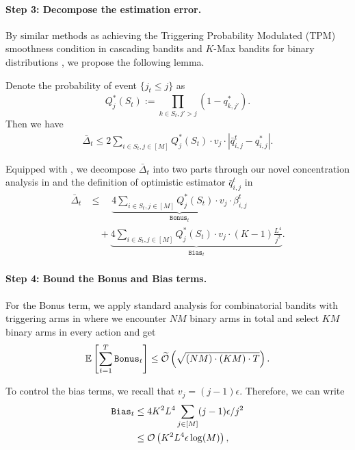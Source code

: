 \paragraph{Step 3: Decompose the estimation error.}
By similar methods as achieving the Triggering Probability Modulated (TPM) smoothness condition in cascading bandits \citep{wang2017improving} and $K$-Max bandits for binary distributions \citep{wang2023combinatorial}, we propose the following lemma.
\begin{lemma}
\label{lemma:tpm}
Denote the probability of event $\{j_t \le j\}$ as 
$$Q_j^*(S_t) :=  \prod_{k \in S_t, j' > j} (1 - q_{k,j'}^*).$$ Then we have
\begin{align}
    \bar \Delta_t \le 2\sum_{i \in S_t, j \in [M]} Q_j^*(S_t) \cdot v_j \cdot \left|\bar q_{i,j}^t - q^*_{i,j}\right|.
\end{align}
\end{lemma}
Equipped with , we decompose $\bar \Delta_t$ into two parts through our novel concentration analysis in  and the definition of optimistic estimator $\bar q_{i,j}^t$ in 
\begin{equation}\label{eq:bar-delta}
\begin{aligned}
    \bar \Delta_t &\le \quad \underbrace{4 \sum_{i \in S_t, j \in [M]} Q_{j}^{*}(S_t) \cdot v_j \cdot \beta_{i,j}^t}_{\texttt{Bonus}_t} \\
    &\quad + \underbrace{4 \sum_{i \in S_t, j \in [M]} Q_{j}^{*}(S_t) \cdot v_j \cdot (K-1)\frac{L^4}{j^2}}_{\texttt{Bias}_t}.
\end{aligned}
\end{equation}


\paragraph{Step 4: Bound the Bonus and Bias terms.}
For the Bonus term, we apply standard analysis for combinatorial bandits with triggering arms in \citep{wang2017improving, liu2023contextual} where we encounter $NM$ binary arms in total and select $KM$ binary arms in every action and get
\begin{align}\label{eq:bonus-sum}
    \mathbb{E}\left[\sum_{t=1}^T \texttt{Bonus}_t \right] \le \widetilde{{\mathcal{O}}}\left(\sqrt{(NM) \cdot (KM) \cdot T}\right).
\end{align}

To control the bias terms, we recall that $v_j = (j-1)\epsilon$. 
Therefore, we can write
\begin{equation}\label{eq:bias}
    \begin{aligned}
    \texttt{Bias}_t &\le 4K^2L^4 \sum_{j \in [M]} (j-1)\epsilon/j^2 \\
    &\le {\mathcal{O}}\left( K^2L^4\epsilon\log(M) \right),
\end{aligned}
\end{equation}

